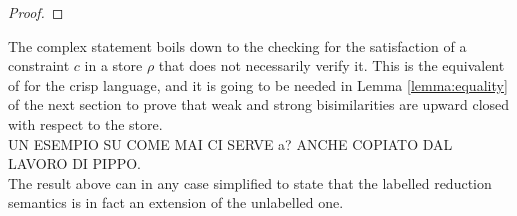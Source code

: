 \documentclass[main.tex]{subfiles}
\begin{document}
\begin{proof}
\end{proof}

The complex statement boils down to the checking for the satisfaction of a constraint $c$
 in a store $\rho$ that does not necessarily verify it.
%
This is the equivalent of \cite[xx]{pippo} for the crisp language, and it is going to be needed in 
Lemma \ref{lemma:equality} of the next section to prove that weak and strong bisimilarities are 
upward closed with respect to the store.
\\

UN ESEMPIO SU COME MAI CI SERVE a? ANCHE COPIATO DAL LAVORO DI PIPPO.
\\

The result above can in any case simplified to state that the labelled reduction semantics is in fact an extension of the unlabelled one.
\end{document}
